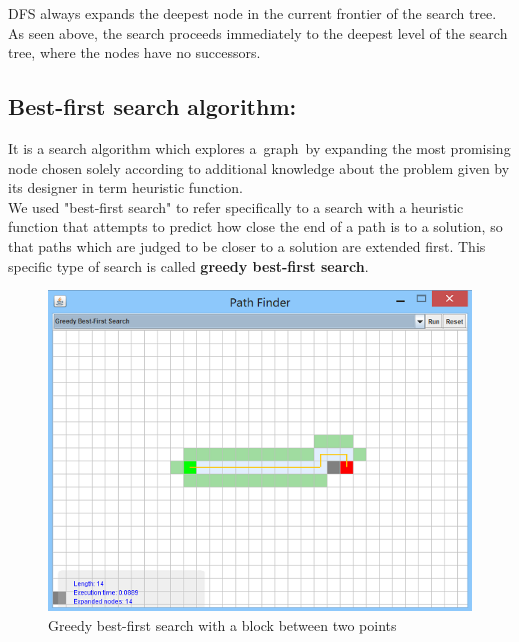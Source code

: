 \documentclass[a4paper]{article}
\begin{document}
DFS always expands the deepest node in the current frontier of the search tree. As seen above, the search proceeds immediately to the deepest level of the search tree, where the nodes have no successors.


\subsection{Best-first search algorithm:}

It is a search algorithm which explores a graph by expanding the most promising node chosen solely according to additional knowledge about the problem given by its designer in term heuristic function.\\

We used "best-first search" to refer specifically to a search with a heuristic function that attempts to predict how close the end of a path is to a solution, so that paths which are judged to be closer to a solution are extended first. This specific type of search is called \textbf{greedy best-first search}. \\

\begin{figure}[h!]
  \centering
    \includegraphics[scale=.9]{images/greedy1.png}
  \caption{Greedy best-first search with a block between two points}
\end{figure}
\end{document}
